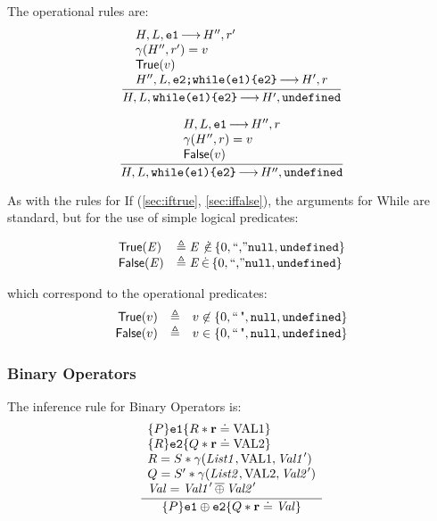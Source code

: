 \documentclass{article}
\begin{document}
The operational rules are:
\[\frac
{  \begin{array}{l}
 H,L,\js{e1} \levalsto H'',\njs{r'} \\ 
 \getValue(H'',\njs{r'})=\njs{v}\\
 \istrue(\njs{v}) \\ 
 H'',L,\js{e2;while(e1)\{e2\}} \levalsto H',\njs{r}
 \end{array}
}
{H,L,\js{while(e1)\{e2\}} \levalsto H',\und }
\]

\[\frac
{\begin{array}{l}
 H,L,\js{e1} \levalsto H'',\njs{r} \\ 
 \getValue(H'',\njs{r})=\njs{v} \\
 \isfalse(\njs{v})
 \end{array}
}
{H,L,\js{while(e1)\{e2\}} \levalsto H'',\und }
\]

As with the rules for If (\ref{sec:iftrue}, \ref{sec:iffalse}), the arguments for While are standard, but for the use of simple logical predicates:

\[
\begin{array}{ll}
        \istrue(\E{E}) &\triangleq \E{E}\notdotin\{0,\str,\nil,\und\}\\
        \isfalse(\E{E}) &\triangleq \E{E}\dotin\{0,\str,\nil,\und\}
\end{array}
\]

which correspond to the operational predicates:
\[\begin{array}{rll}
        \istrue(v)&\triangleq& v\not\in\falsity\\
        \isfalse(v)&\triangleq &v\in\falsity
\end{array}\]


\subsubsection{Binary Operators}

The inference rule for Binary Operators is:
\[\frac
{\begin{array}{l}
        \tr P {\js{e1}} {R\sep\rv\doteq\V{VAL1}}  \\
 \tr R {\js{e2}} {Q\sep\rv\doteq\V{VAL2}} \\
    R = S \sep\getValue(\E{List1},\V{VAL1},\E{Val1}') \\
    Q = S'\sep\getValue(\E{List2},\V{VAL2},\E{Val2}')\\
    \E{Val} = \E{Val1}'\primop\E{Val2}'\end{array}}
{\tr   P {\js{e1}\oplus\js{e2}} { Q\sep\rv\doteq \E{Val} }}
\]
\end{document}

